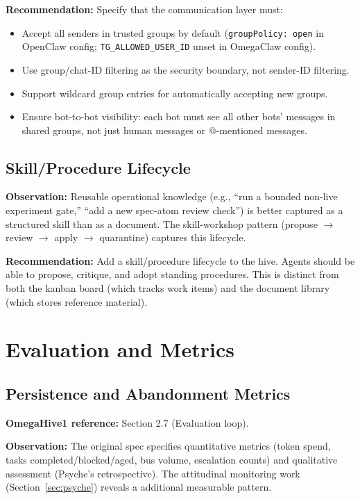 \documentclass[11pt,a4paper]{article}
\begin{document}
\textbf{Recommendation:} Specify that the communication layer must:

\begin{itemize}[nosep]
  \item Accept all senders in trusted groups by default
    (\texttt{groupPolicy: open} in OpenClaw config;
    \texttt{TG\_ALLOWED\_USER\_ID} unset in OmegaClaw config).
  \item Use group/chat-ID filtering as the security boundary, not
    sender-ID filtering.
  \item Support wildcard group entries for automatically accepting
    new groups.
  \item Ensure bot-to-bot visibility: each bot must see all other bots'
    messages in shared groups, not just human messages or
    @-mentioned messages.
\end{itemize}

\subsection{Skill/Procedure Lifecycle}
\label{sec:skill-lifecycle}

\textbf{Observation:} Reusable operational knowledge (e.g., ``run a
bounded non-live experiment gate,'' ``add a new spec-atom review check'')
is better captured as a structured skill than as a document. The
skill-workshop pattern (propose $\to$ review $\to$ apply $\to$ quarantine)
captures this lifecycle.

\textbf{Recommendation:} Add a skill/procedure lifecycle to the hive.
Agents should be able to propose, critique, and adopt standing
procedures. This is distinct from both the kanban board (which tracks
work items) and the document library (which stores reference material).

\section{Evaluation and Metrics}

\subsection{Persistence and Abandonment Metrics}
\label{sec:evaluation}

\textbf{OmegaHive1 reference:} Section 2.7 (Evaluation loop).

\textbf{Observation:} The original spec specifies quantitative metrics
(token spend, tasks completed/blocked/aged, bus volume, escalation
counts) and qualitative assessment (Psyche's retrospective). The
attitudinal monitoring work (Section~\ref{sec:psyche}) reveals a
additional measurable pattern.
\end{document}

